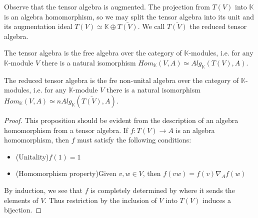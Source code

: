 \documentclass[../thesis.tex]{subfiles}
\begin{document}
            Observe that the tensor algebra is augmented. The projection from $T(V)$ into $\mathbb{K}$ is an algebra homomorphism, so we may split the tensor algebra into its unit and its augmentation ideal $T(V) \simeq \mathbb{K}\oplus\bar{T(V)}$. We call $\bar{T(V)}$ the reduced tensor algebra.

            \begin{proposition}
                The tensor algebra is the free algebra over the category of $\mathbb{K}$-modules, i.e. for any $\mathbb{K}$-module $V$ there is a natural isomorphism $Hom_{\mathbb{K}}(V,A)\simeq Alg_{\mathbb{K}}(T(V),A)$.

                The reduced tensor algebra is the fre non-unital algebra over the category of $\mathbb{K}$-modules, i.e. for any $\mathbb{K}$-module $V$ there is a natural isomorphism $Hom_{\mathbb{K}}(V,A)\simeq nAlg_{\mathbb{K}}(\bar{T(V)},A)$.
            \end{proposition}

            \begin{proof}
                This proposition should be evident from the description of an algebra homomorphism from a tensor algebra. If $f: T(V) \rightarrow A$ is an algebra homomorphism, then $f$ must satisfy the following conditions:
                \begin{itemize}
                    \item (Unitality)\quad $f(1) = 1$
                    \item (Homomorphism property)\quad Given $v,w\in V$, then $f(vw) = f(v)\nabla_Af(w)$
                \end{itemize}
                By induction, we see that $f$ is completely determined by where it sends the elements of $V$. Thus restriction by the inclusion of $V$ into $T(V)$ induces a bijection.
            \end{proof}
\end{document}
